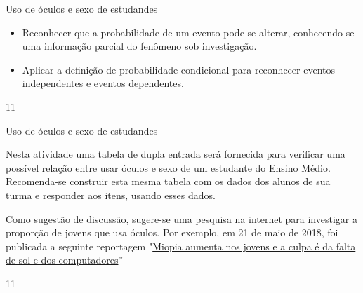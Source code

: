 \def\currentcolor{session1}
\begin{objectives}{Uso de óculos e sexo de estudandes}
{
\begin{itemize}
\item Reconhecer que a probabilidade de um evento pode se alterar, conhecendo-se uma informação parcial do fenômeno sob investigação.
\item Aplicar a definição de probabilidade condicional para reconhecer eventos independentes e eventos dependentes.
\end{itemize}
}{1}{1}
\end{objectives}
\begin{sugestions}{Uso de óculos e sexo de estudandes}
{
Nesta atividade uma tabela de dupla entrada será fornecida para verificar uma possível relação entre usar óculos e sexo de um estudante do Ensino Médio. Recomenda-se construir esta mesma tabela com os dados dos alunos de sua turma e responder aos itens, usando esses dados.

Como sugestão de discussão, sugere-se uma pesquisa na internet para investigar a proporção de jovens que usa óculos. Por exemplo, em 21 de maio de 2018, foi publicada a seguinte reportagem "\href{https://www.dn.pt/sociedade/interior/miopia-aumenta-nos-jovens-e-a-culpa-e-da-falta-de-sol-e-dos-computadores-5656709.html}{Miopia aumenta nos jovens e a culpa é da falta de sol e dos computadores}”
}{1}{1}
\end{sugestions}
